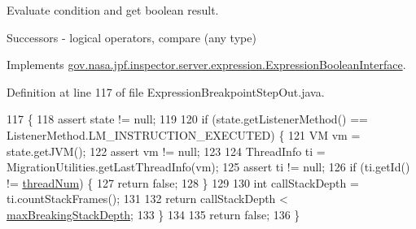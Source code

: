 Evaluate condition and get boolean result. 

Successors -\/ logical operators, compare (any type) 

Implements \hyperlink{interfacegov_1_1nasa_1_1jpf_1_1inspector_1_1server_1_1expression_1_1_expression_boolean_interface_adc81f58d2517d5ccb9ace7f5d8b8211f}{gov.\+nasa.\+jpf.\+inspector.\+server.\+expression.\+Expression\+Boolean\+Interface}.



Definition at line 117 of file Expression\+Breakpoint\+Step\+Out.\+java.


\begin{DoxyCode}
117                                                            \{
118     assert state != null;
119 
120     \textcolor{keywordflow}{if} (state.getListenerMethod() == ListenerMethod.LM\_INSTRUCTION\_EXECUTED) \{
121       VM vm = state.getJVM();
122       assert vm != null;
123 
124       ThreadInfo ti = MigrationUtilities.getLastThreadInfo(vm);
125       assert ti != null;
126       \textcolor{keywordflow}{if} (ti.getId() != \hyperlink{classgov_1_1nasa_1_1jpf_1_1inspector_1_1server_1_1expression_1_1expressions_1_1_expression_breakpoint_step_out_a26bade410d323cf7876faa4dc9ef28c4}{threadNum}) \{
127         \textcolor{keywordflow}{return} \textcolor{keyword}{false};
128       \}
129 
130       \textcolor{keywordtype}{int} callStackDepth = ti.countStackFrames();
131 
132       \textcolor{keywordflow}{return} callStackDepth < \hyperlink{classgov_1_1nasa_1_1jpf_1_1inspector_1_1server_1_1expression_1_1expressions_1_1_expression_breakpoint_step_out_a14730a9260589b7a29fe2bc6daf750ad}{maxBreakingStackDepth};
133     \}
134 
135     \textcolor{keywordflow}{return} \textcolor{keyword}{false};
136   \}
\end{DoxyCode}
